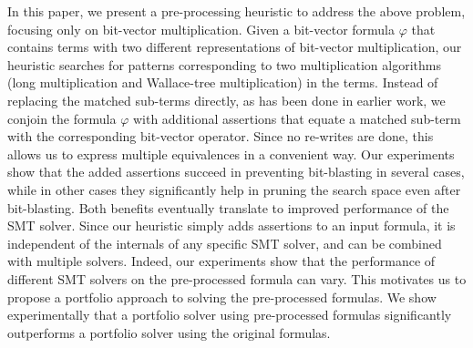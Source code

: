 In this paper, we present a pre-processing heuristic to address the
above problem, focusing only on bit-vector multiplication.  Given a
bit-vector formula $\varphi$ that contains terms with two different
representations of bit-vector multiplication, our heuristic searches
for patterns corresponding to two multiplication algorithms (long
multiplication and Wallace-tree multiplication) in the terms. Instead
of replacing the matched sub-terms directly, as has been done in
earlier work, we conjoin the formula $\varphi$ with additional
assertions that equate a matched sub-term with the corresponding
bit-vector operator.  Since no re-writes are done, this allows us to
express multiple equivalences in a convenient way.  Our experiments
show that the added assertions succeed in preventing bit-blasting in
several cases, while in other cases they significantly help in pruning
the search space even after bit-blasting.  Both benefits eventually
translate to improved performance of the SMT solver.  Since our
heuristic simply adds assertions to an input formula, it is
independent of the internals of any specific SMT solver, and can be
combined with multiple solvers.  Indeed, our experiments show that the
performance of different SMT solvers on the pre-processed formula can
vary.  This motivates us to propose a portfolio approach to solving
the pre-processed formulas.  We show experimentally that a portfolio
solver using pre-processed formulas significantly outperforms a
portfolio solver using the original formulas.



%
